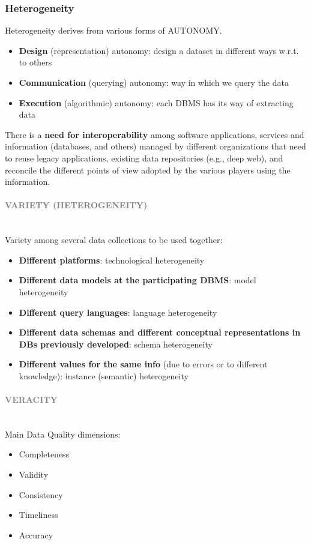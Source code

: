 \documentclass[10pt,a4paper]{article}
\newcommand{\myparagraph}[1]{\paragraph{\normalsize{\textcolor{gray}{\uppercase{\textbf{#1}}}} }\mbox{} \vspace{0.5em}\\}
\begin{document}
\subsubsection{Heterogeneity}
Heterogeneity derives from various forms of AUTONOMY.
\begin{itemize}
	\item \textbf{Design} (representation) autonomy: design a dataset in different ways w.r.t. to others
	\item \textbf{Communication} (querying) autonomy: way in which we query the data
	\item \textbf{Execution} (algorithmic) autonomy: each DBMS has its way of extracting data
\end{itemize}
There is a \textbf{need for interoperability} among software applications, services and information (databases, and others) managed by different organizations that need to reuse legacy applications, existing data repositories (e.g., deep web), and reconcile the different points of view adopted by the various players using the information.
\myparagraph{VARIETY (heterogeneity)}
Variety among several data collections to be used together:
\begin{itemize}
	\item \textbf{Different platforms}: technological heterogeneity
	\item \textbf{Different data models at the participating DBMS}: model heterogeneity
	\item \textbf{Different query languages}: language heterogeneity
	\item \textbf{Different data schemas and different conceptual representations in DBs previously developed}: schema heterogeneity
	\item \textbf{Different values for the same info} (due to errors or to different knowledge): instance (semantic) heterogeneity
\end{itemize}
\myparagraph{VERACITY}
Main Data Quality dimensions:
\begin{itemize}
	\item Completeness
	\item Validity
	\item Consistency
	\item Timeliness
	\item Accuracy
\end{itemize}
\end{document}
